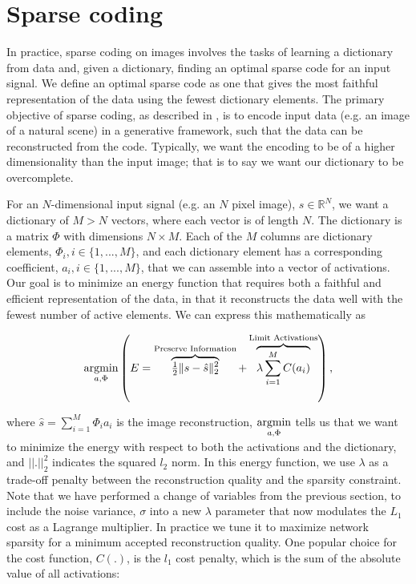 \section{Sparse coding}
In practice, sparse coding on images involves the tasks of learning a dictionary from data and, given a dictionary, finding an optimal sparse code for an input signal. We define an optimal sparse code as one that gives the most faithful representation of the data using the fewest dictionary elements. The primary objective of sparse coding, as described in \parencite{olshausen1997sparse}, is to encode input data (e.g. an image of a natural scene) in a generative framework, such that the data can be reconstructed from the code. Typically, we want the encoding to be of a higher dimensionality than the input image; that is to say we want our dictionary to be overcomplete.

For an $N$-dimensional input signal (e.g. an $N$ pixel image), $s \in \mathbb{R}^{N}$, we want a dictionary of $M > N$ vectors, where each vector is of length $N$. The dictionary is a matrix $\Phi$ with dimensions $N \times M$. Each of the $M$ columns are dictionary elements, $\Phi_{i}, i \in \{1,...,M\}$, and each dictionary element has a corresponding coefficient, $a_{i}, i \in \{1,...,M\}$, that we can assemble into a vector of activations. Our goal is to minimize an energy function that requires both a faithful and efficient representation of the data, in that it reconstructs the data well with the fewest number of active elements. We can express this mathematically as

\begin{equation}\label{eq:ch2_sparse_energy}
    \argmin\limits_{a, \Phi}
        \left( E =
            \overbrace{ \tfrac{1}{2} \| s - \hat{s} \|_{2}^{2} }^\text{Preserve Information} +
        \overbrace{ \lambda \sum\limits_{i=1}^{M}C(a_{i}) }^\text{Limit Activations} \right),
\end{equation}

\noindent where $\hat{s} = \sum\limits_{i=1}^{M}\Phi_{i}a_{i}$ is the image reconstruction, $\argmin\limits_{a, \Phi}$ tells us that we want to minimize the energy with respect to both the activations and the dictionary, and $||.||_2^2$ indicates the squared $l_2$ norm. In this energy function, we use $\lambda$ as a trade-off penalty between the reconstruction quality and the sparsity constraint. Note that we have performed a change of variables from the previous section, to include the noise variance, $\sigma$ into a new $\lambda$ parameter that now modulates the $L_{1}$ cost as a Lagrange multiplier. In practice we tune it to maximize network sparsity for a minimum accepted reconstruction quality. One popular choice for the cost function, $C(.)$, is the $l_1$ cost penalty, which is the sum of the absolute value of all activations:

